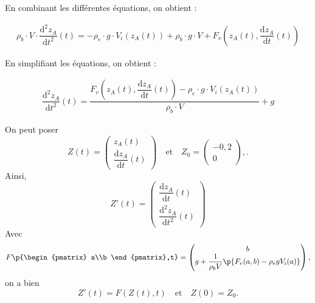 \question{} 



En combinant les différentes équations, on obtient : 

\begin{align*}
\rho_b\cdot V \cdot \dfrac{\mathrm{d}^2z_A}{\mathrm{d}t^2}(t)=-\rho_e\cdot g\cdot V_i(z_A(t))+\rho_b\cdot g\cdot V+F_v\left(z_A(t),\dfrac{\mathrm{d}z_A}{\mathrm{d}t}(t)\right)
\end{align*}

En simplifiant les équations, on obtient : 

\begin{align*}
\dfrac{\mathrm{d}^2z_A}{\mathrm{d}t^2}(t)=\dfrac{F_v\left(z_A(t),\dfrac{\mathrm{d}z_A}{\mathrm{d}t}(t)\right)-\rho_e\cdot g\cdot V_i(z_A(t))}{\rho_b\cdot V}+g
\end{align*}

\question{} 

On peut poser 
\begin{equation*}
    Z(t) = \begin{pmatrix} z_A(t) \\ \dfrac{\mathrm{d}z_A}{\mathrm{d}t}(t)\end{pmatrix} \quad\textrm{et}\quad Z_0 = \begin{pmatrix} -0,2 \\ 0 \end{pmatrix},.
\end{equation*}
Ainsi, 
\begin{equation*}
    Z'(t) = \begin{pmatrix}\dfrac{\mathrm{d}z_A}{\mathrm{d}t}(t) \\ \dfrac{\mathrm{d}^2z_A}{\mathrm{d}t^2}(t) \end{pmatrix}
\end{equation*}
Avec 
\begin{equation*}
    F \p{\begin{pmatrix} a\\b \end{pmatrix},t} = \begin{pmatrix} b \\ g + \dfrac{1}{\rho_b V} \p{F_v(a,b) - \rho_e g V_i(a)} \end{pmatrix},
\end{equation*}
on a bien 
\begin{equation*}
    Z'(t) = F(Z(t),t) \quad\textrm{et}\quad Z(0) = Z_0.
\end{equation*}

